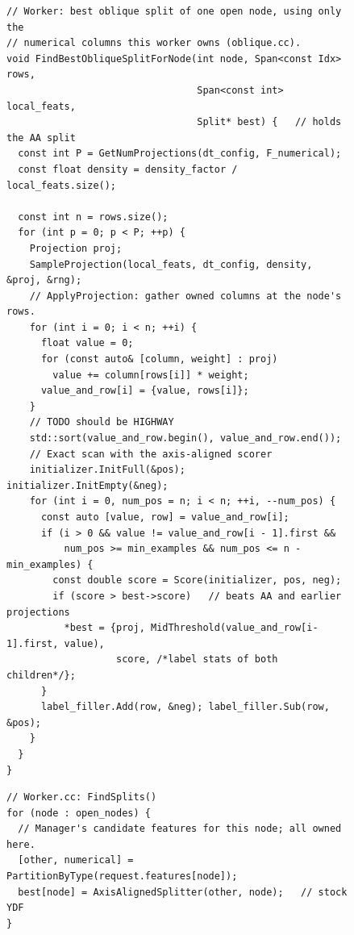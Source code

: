 \begin{figure}[t]
\begin{minipage}[t]{0.52\textwidth}
\begin{lstlisting}
// Worker: best oblique split of one open node, using only the
// numerical columns this worker owns (oblique.cc).
void FindBestObliqueSplitForNode(int node, Span<const Idx> rows,
                                 Span<const int> local_feats,
                                 Split* best) {   // holds the AA split
  const int P = GetNumProjections(dt_config, F_numerical);
  const float density = density_factor / local_feats.size();
 
  const int n = rows.size();
  for (int p = 0; p < P; ++p) {
    Projection proj;
    SampleProjection(local_feats, dt_config, density, &proj, &rng);
    // ApplyProjection: gather owned columns at the node's rows.
    for (int i = 0; i < n; ++i) {
      float value = 0;
      for (const auto& [column, weight] : proj)
        value += column[rows[i]] * weight;
      value_and_row[i] = {value, rows[i]};
    }
    // TODO should be HIGHWAY
    std::sort(value_and_row.begin(), value_and_row.end());
    // Exact scan with the axis-aligned scorer
    initializer.InitFull(&pos); initializer.InitEmpty(&neg);
    for (int i = 0, num_pos = n; i < n; ++i, --num_pos) {
      const auto [value, row] = value_and_row[i];
      if (i > 0 && value != value_and_row[i - 1].first &&
          num_pos >= min_examples && num_pos <= n - min_examples) {
        const double score = Score(initializer, pos, neg);
        if (score > best->score)   // beats AA and earlier projections
          *best = {proj, MidThreshold(value_and_row[i-1].first, value),
                   score, /*label stats of both children*/};
      }
      label_filler.Add(row, &neg); label_filler.Sub(row, &pos);
    }
  }
}
\end{lstlisting}
\end{minipage}\hfill
\begin{minipage}[t]{0.46\textwidth}
\begin{lstlisting}
// Worker.cc: FindSplits()
for (node : open_nodes) {
  // Manager's candidate features for this node; all owned here.
  [other, numerical] = PartitionByType(request.features[node]);
  best[node] = AxisAlignedSplitter(other, node);   // stock YDF
}


\end{lstlisting}
\end{minipage}
\end{figure}
